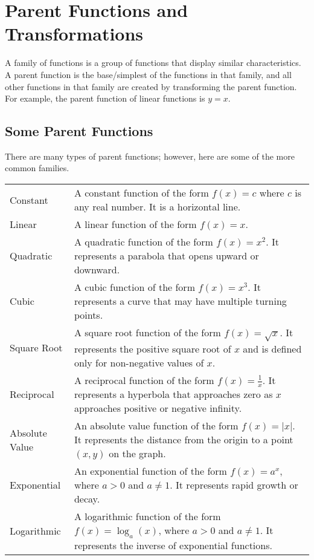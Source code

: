 \documentclass[11pt]{article}
\begin{document}
\section{Parent Functions and Transformations}

A family of functions is a group of functions that display similar characteristics. A parent function is the base/simplest of the functions in that family, and all other functions in that family are created by transforming the parent function. For example, the parent function of linear functions is $y=x$.

\subsection{Some Parent Functions}

There are many types of parent functions; however, here are some of the more common families.

\renewcommand{\arraystretch}{1.25}
\begin{table}[H]
    \centering
    \begin{tabular}{p{2cm} p{10cm}}
    Constant & A constant function of the form $f(x) = c$ where $c$ is any real number. It is a horizontal line. \\ 
    Linear & A linear function of the form $f(x) = x$. \\
    Quadratic & A quadratic function of the form $f(x) = x^2$. It represents a parabola that opens upward or downward. \\
    Cubic & A cubic function of the form $f(x) = x^3$. It represents a curve that may have multiple turning points. \\
    Square Root & A square root function of the form $f(x) = \sqrt{x}$. It represents the positive square root of $x$ and is defined only for non-negative values of $x$. \\
    Reciprocal & A reciprocal function of the form $f(x) = \frac{1}{x}$. It represents a hyperbola that approaches zero as $x$ approaches positive or negative infinity. \\
    Absolute Value & An absolute value function of the form $f(x) = |x|$. It represents the distance from the origin to a point $(x,y)$ on the graph. \\
    Exponential & An exponential function of the form $f(x) = a^x$, where $a > 0$ and $a \neq 1$. It represents rapid growth or decay. \\
    Logarithmic & A logarithmic function of the form $f(x) = \log_a(x)$, where $a > 0$ and $a \neq 1$. It represents the inverse of exponential functions.
    \end{tabular}
\end{table}
\renewcommand{\arraystretch}{1}
\end{document}
